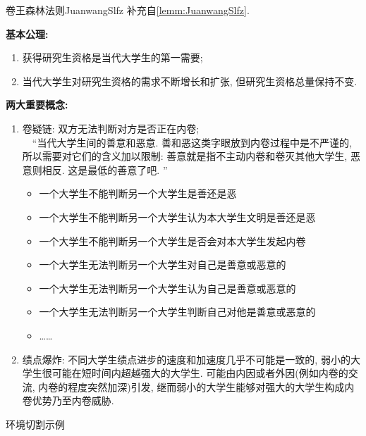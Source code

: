 \documentclass[hyperref,UTF8,11pt]{beamer}
\begin{document}
\begin{lrbox}{\mysavebox}
	\begin{SCUremark}{卷王森林法则}{JuanwangSlfz}
		补充自\vref{lemm:JuanwangSlfz}.\par
		\textbf{\color{JXred}基本公理:}
		\begin{enumerate}
			\item 获得研究生资格是当代大学生的第一需要;
			\item 当代大学生对研究生资格的需求不断增长和扩张, 但研究生资格总量保持不变.
		\end{enumerate}
		\textbf{\color{JXred}两大重要概念:}
		\begin{enumerate}
			\item 卷疑链: 双方无法判断对方是否正在内卷;\\
			~~“当代大学生间的善意和恶意. 善和恶这类字眼放到内卷过程中是不严谨的, 所以需要对它们的含义加以限制: 善意就是指不主动内卷和卷灭其他大学生, 恶意则相反. 这是最低的善意了吧. ”
			\begin{itemize}
				\item 一个大学生不能判断另一个大学生是善还是恶
				\item 一个大学生不能判断另一个大学生认为本大学生文明是善还是恶
				\item 一个大学生不能判断另一个大学生是否会对本大学生发起内卷
				\item 一个大学生无法判断另一个大学生对自己是善意或恶意的
				\item 一个大学生无法判断另一个大学生认为自己是善意或恶意的
				\item 一个大学生无法判断另一个大学生判断自己对他是善意或恶意的
				\item \dots\dots
			\end{itemize}	
			\item 绩点爆炸: 不同大学生绩点进步的速度和加速度几乎不可能是一致的, 弱小的大学生很可能在短时间内超越强大的大学生. 可能由内因或者外因(例如内卷的交流, 内卷的程度突然加深)引发, 继而弱小的大学生能够对强大的大学生构成内卷优势乃至内卷威胁.
		\end{enumerate}
	\end{SCUremark}
\end{lrbox}
\begin{frame}{环境切割示例}
\end{frame}
\end{document}
